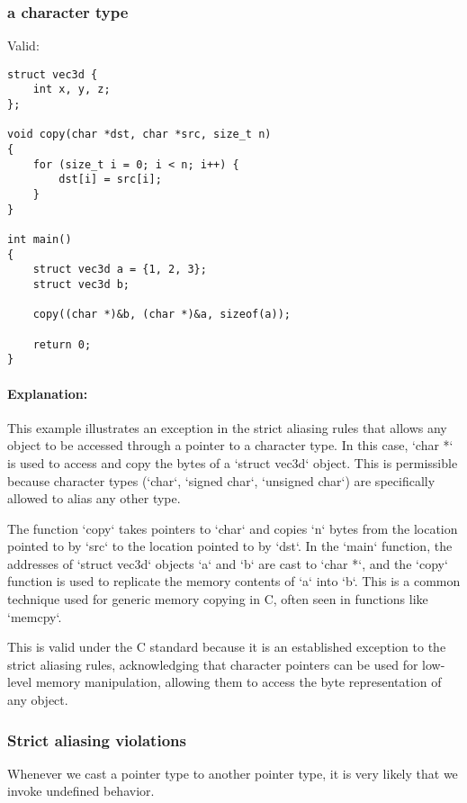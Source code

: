 \documentclass[12pt]{article}
\begin{document}
\subsubsection{a character type}

Valid:

\begin{verbatim}
struct vec3d {
    int x, y, z;
};

void copy(char *dst, char *src, size_t n)
{
    for (size_t i = 0; i < n; i++) {
        dst[i] = src[i];
    }
}

int main()
{
    struct vec3d a = {1, 2, 3};
    struct vec3d b;

    copy((char *)&b, (char *)&a, sizeof(a));

    return 0;
}
\end{verbatim}


\paragraph{Explanation:}
This example illustrates an exception in the strict aliasing rules that allows any object to be accessed through a pointer to a character type. In this case, `char *` is used to access and copy the bytes of a `struct vec3d` object. This is permissible because character types (`char`, `signed char`, `unsigned char`) are specifically allowed to alias any other type.

The function `copy` takes pointers to `char` and copies `n` bytes from the location pointed to by `src` to the location pointed to by `dst`. In the `main` function, the addresses of `struct vec3d` objects `a` and `b` are cast to `char *`, and the `copy` function is used to replicate the memory contents of `a` into `b`. This is a common technique used for generic memory copying in C, often seen in functions like `memcpy`.

This is valid under the C standard because it is an established exception to the strict aliasing rules, acknowledging that character pointers can be used for low-level memory manipulation, allowing them to access the byte representation of any object.

\subsubsection{Strict aliasing violations}

Whenever we cast a pointer type to another pointer type,
it is very likely that we invoke undefined behavior.
\end{document}
